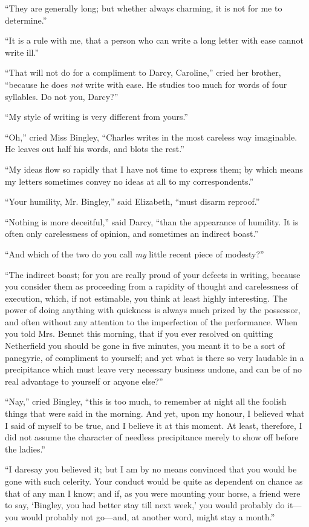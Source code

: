 ``They are generally long; but whether always charming, it is not for me to determine.''

``It is a rule with me, that a person who can write a long letter with ease cannot write ill.''

``That will not do for a compliment to Darcy, Caroline,'' cried her brother, ``because he does \textit{not} write with ease. He studies too much for words of four syllables. Do not you, Darcy?''

``My style of writing is very different from yours.''

``Oh,'' cried Miss Bingley, ``Charles writes in the most careless way imaginable. He leaves out half his words, and blots the rest.''

``My ideas flow so rapidly that I have not time to express them; by which means my letters sometimes convey no ideas at all to my correspondents.''

``Your humility, Mr. Bingley,'' said Elizabeth, ``must disarm reproof.''

``Nothing is more deceitful,'' said Darcy, ``than the appearance of humility. It is often only carelessness of opinion, and sometimes an indirect boast.''

``And which of the two do you call \textit{my} little recent piece of modesty?''

``The indirect boast; for you are really proud of your defects in writing, because you consider them as proceeding from a rapidity of thought and carelessness of execution, which, if not estimable, you think at least highly interesting. The power of doing anything with quickness is always much prized by the possessor, and often without any attention to the imperfection of the performance. When you told Mrs. Bennet this morning, that if you ever resolved on quitting Netherfield you should be gone in five minutes, you meant it to be a sort of panegyric, of compliment to yourself; and yet what is there so very laudable in a precipitance which must leave very necessary business undone, and can be of no real advantage to yourself or anyone else?''

``Nay,'' cried Bingley, ``this is too much, to remember at night all the foolish things that were said in the morning. And yet, upon my honour, I believed what I said of myself to be true, and I believe it at this moment. At least, therefore, I did not assume the character of needless precipitance merely to show off before the ladies.''

``I daresay you believed it; but I am by no means convinced that you would be gone with such celerity. Your conduct would be quite as dependent on chance as that of any man I know; and if, as you were mounting your horse, a friend were to say, `Bingley, you had better stay till next week,' you would probably do it---you would probably not go---and, at another word, might stay a month.''

